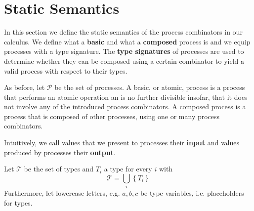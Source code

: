 


\section{Static Semantics}
\label{chp:static_semantics}
In this section we define the static semantics of the process combinators in our calculus. We define what a \textbf{basic} and what a \textbf{composed} process is and we equip processes with a type signature. The \textbf{type signatures} of processes are used to determine whether they can be composed using a certain combinator to yield a valid process with respect to their types.

As before, let $\mathcal{P}$ be the set of processes. A basic, or atomic, process is a process that performs an atomic operation an is no further divisible insofar, that it does not involve any of the introduced process combinators. A composed process is a process that is composed of other processes, using one or many process combinators.

Intuitively, we call values that we present to processes their \textbf{input} and values produced by processes their \textbf{output}.

\begin{definition}
Let $\mathcal{T}$ be the set of types and $T_i$ a type for every $i$ with
\begin{equation*}
  \mathcal{T} = \bigcup_i \left\{ T_i \right\}
\end{equation*}
Furthermore, let lowercase letters, e.g. $a, b, c$ be type variables, i.e. placeholders for types.

\hfill\qedsymbol
\end{definition}

